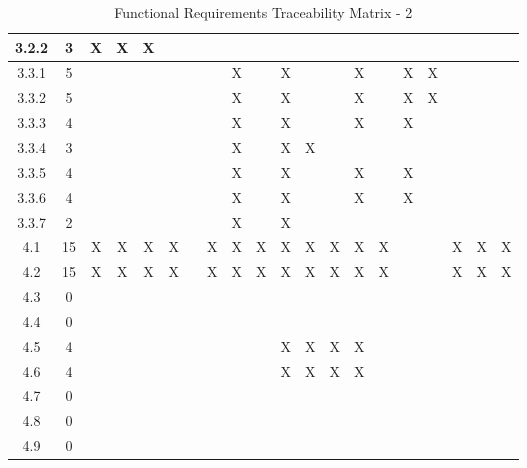 \documentclass[titlepage]{article}
\begin{document}
\begin{center}
\begin{table}[h!]
\begin{tabular}{|c|c|c|c|c |c|c|c|c|c |c|c|c|c|c |c|c|c|c|c|}
3.2.2 &3&X&X&X &&&&& &&&&& &&&&&\\\hline
3.3.1 &5&&& &&&&X& &X&&&X& &X&X&&&\\\hline
3.3.2 &5&&& &&&&X& &X&&&X& &X&X&&&\\\hline
3.3.3 &4&&& &&&&X& &X&&&X& &X&&&&\\\hline
3.3.4 &3&&& &&&&X& &X&X&&& &&&&&\\\hline
3.3.5 &4&&& &&&&X& &X&&&X& &X&&&&\\\hline
3.3.6 &4&&& &&&&X& &X&&&X& &X&&&&\\\hline
3.3.7 &2&&& &&&&X& &X&&&& &&&&&\\\hline
4.1 &15&X&X&X &X&&X&X&X &X&X&X&X&X &&&X&X&X\\\hline
4.2 &15&X&X&X &X&&X&X&X &X&X&X&X&X &&&X&X&X\\\hline
4.3 &0&&& &&&&& &&&&& &&&&&\\\hline
4.4 &0&&& &&&&& &&&&& &&&&&\\\hline
4.5 &4&&& &&&&& &X&X&X&X& &&&&&\\\hline
4.6 &4&&& &&&&& &X&X&X&X& &&&&&\\\hline
4.7 &0&&& &&&&& &&&&& &&&&&\\\hline
4.8 &0&&& &&&&& &&&&& &&&&&\\\hline
4.9 &0&&& &&&&& &&&&& &&&&&\\\hline
\end{tabular}
\caption{Functional Requirements Traceability Matrix - 2}
\end{table}
\end{center}
\newpage
\end{document}
